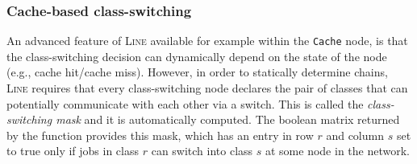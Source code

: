 
\subsubsection{Cache-based class-switching}
\label{cache-based-class-switching}
An advanced feature of \textsc{Line} available for example within the \texttt{Cache} node, is that the class-switching decision can dynamically depend on the state of the node (e.g., cache hit/cache miss). However, in order to statically determine chains, \textsc{Line} requires that every class-switching node declares the pair of classes that can potentially communicate with each other via a switch. This is called the {\em class-switching mask} and it is automatically computed. The boolean matrix returned by the  function provides this mask, which has an entry in row $r$ and column $s$ set to true only if jobs in class $r$ can switch into class $s$ at some node in the network.

